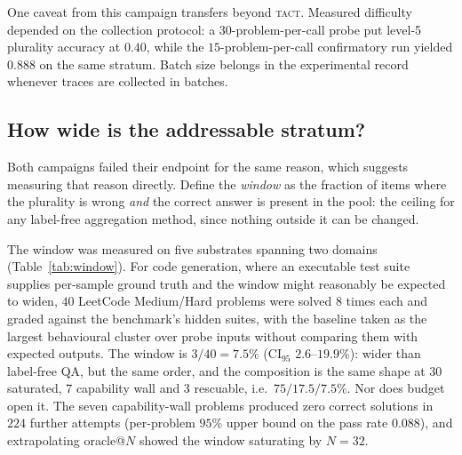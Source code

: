 \documentclass[conference]{IEEEtran}
\newcommand{\TACT}{\textsc{tact}}
\begin{document}
One caveat from this campaign transfers beyond \TACT. Measured difficulty
depended on the collection protocol: a $30$-problem-per-call probe put
level-5 plurality accuracy at $0.40$, while the $15$-problem-per-call
confirmatory run yielded $0.888$ on the same stratum. Batch size belongs in
the experimental record whenever traces are collected in batches.

\subsection{How wide is the addressable stratum?}\label{sec:window}
Both campaigns failed their endpoint for the same reason, which suggests
measuring that reason directly. Define the \emph{window} as the fraction of
items where the plurality is wrong \emph{and} the correct answer is present
in the pool: the ceiling for any label-free aggregation method, since nothing
outside it can be changed.

The window was measured on five substrates spanning two domains
(Table~\ref{tab:window}). For code generation, where an executable test suite
supplies per-sample ground truth and the window might reasonably be expected
to widen, $40$ LeetCode Medium/Hard problems \cite{leetcodedataset} were
solved $8$ times each and graded against the benchmark's hidden suites, with
the baseline taken as the largest behavioural cluster over probe inputs
without comparing them with expected outputs. The window is $3/40=7.5\%$ (CI$_{95}$
$2.6$--$19.9\%$): wider than label-free QA, but the same order, and the
composition is the same shape at $30$ saturated, $7$ capability wall and $3$
rescuable, i.e.\ $75/17.5/7.5\%$. Nor does budget open it. The seven capability-wall problems
produced zero correct solutions in $224$ further attempts (per-problem $95\%$
upper bound on the pass rate $0.088$), and extrapolating oracle@$N$ showed the
window saturating by $N{=}32$.
\end{document}
